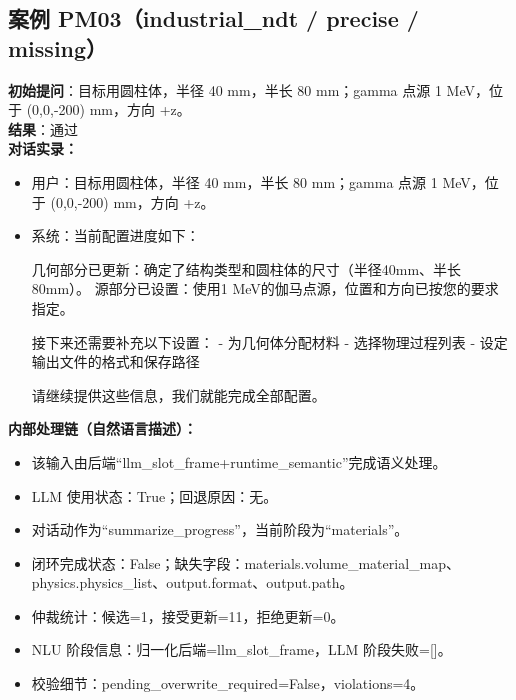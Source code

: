 \documentclass[11pt]{ctexart}
\begin{document}
\subsection{案例 PM03（industrial\_ndt / precise / missing）}
\textbf{初始提问}：目标用圆柱体，半径 40 mm，半长 80 mm；gamma 点源 1 MeV，位于 (0,0,-200) mm，方向 +z。\\
\textbf{结果}：通过\\
\textbf{对话实录：}
\begin{itemize}
\item 用户：目标用圆柱体，半径 40 mm，半长 80 mm；gamma 点源 1 MeV，位于 (0,0,-200) mm，方向 +z。
\item 系统：当前配置进度如下：

几何部分已更新：确定了结构类型和圆柱体的尺寸（半径40mm、半长80mm）。  
源部分已设置：使用1 MeV的伽马点源，位置和方向已按您的要求指定。  

接下来还需要补充以下设置：  
- 为几何体分配材料  
- 选择物理过程列表  
- 设定输出文件的格式和保存路径  

请继续提供这些信息，我们就能完成全部配置。
\end{itemize}
\textbf{内部处理链（自然语言描述）：}
\begin{itemize}
\item 该输入由后端“llm\_slot\_frame+runtime\_semantic”完成语义处理。
\item LLM 使用状态：True；回退原因：无。
\item 对话动作为“summarize\_progress”，当前阶段为“materials”。
\item 闭环完成状态：False；缺失字段：materials.volume\_material\_map、physics.physics\_list、output.format、output.path。
\item 仲裁统计：候选=1，接受更新=11，拒绝更新=0。
\item NLU 阶段信息：归一化后端=llm\_slot\_frame，LLM 阶段失败=[]。
\item 校验细节：pending\_overwrite\_required=False，violations=4。
\end{itemize}
\end{document}
